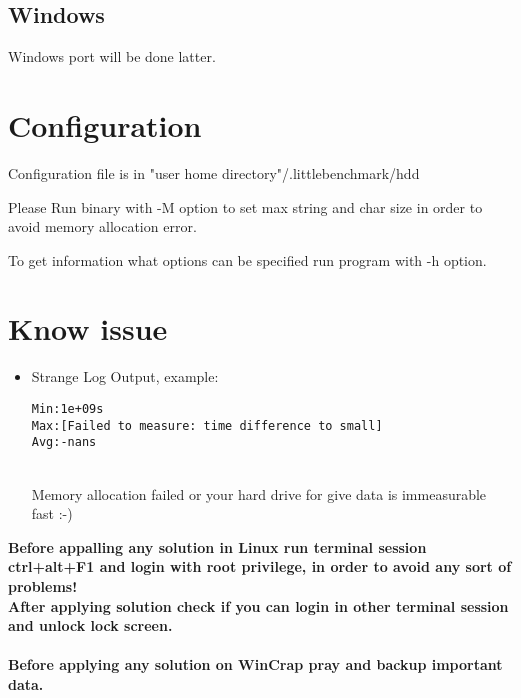 \documentclass[a4paper]{article}
\begin{document}
\subsection{Windows}
Windows port will be done latter.

\section{Configuration}
Configuration file is in "user home directory"/.littlebenchmark/hdd

Please Run binary with -M option to set max string and char size in order to avoid memory allocation error.

To get information what options can be specified run program with -h option.

\newpage
\section{Know issue}
\begin{itemize}
\item Strange Log Output, example: \begin{verbatim}
Min:1e+09s
Max:[Failed to measure: time difference to small]
Avg:-nans
\end{verbatim}\\
Memory allocation failed or your hard drive for give data is immeasurable fast :-)
\end{itemize}
{\bf Before appalling any solution in Linux run terminal session ctrl+alt+F1 and login with root privilege, in order to avoid any sort of problems!\\
After applying solution check if you can login in other terminal session and unlock lock screen.\\ \\
}
{\bf Before applying any solution on WinCrap pray and backup important data.
}
\end{document}

